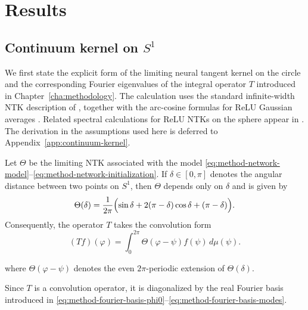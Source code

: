 \chapter{\label{cha:results}Results}

\section{Continuum kernel on \(S^1\)}

We first state the explicit form of the limiting neural tangent kernel on the circle and the
corresponding Fourier eigenvalues of the integral operator \(T\) introduced in
Chapter~\ref{cha:methodology}. The calculation uses the standard infinite-width NTK
description of \citet{jacot2018ntk}, together with the
arc-cosine formulas for ReLU Gaussian averages \citep{cho2009kernel}. Related spectral
calculations for ReLU NTKs on the sphere appear in
\citet{basri2019convergence,bietti2019inductivebiasneuraltangent,cao2020understandingspectralbiasdeep}. The derivation in the
assumptions used here is deferred to Appendix~\ref{app:continuum-kernel}.

\begin{proposition}
	\label{prop:results-continuum-ntk}
	Let \(\Theta\) be the limiting NTK associated with the model
	\eqref{eq:method-network-model}--\eqref{eq:method-network-initialization}. If
	\(\delta\in[0,\pi]\) denotes the angular distance between two points on \(S^1\), then
	\(\Theta\) depends only on \(\delta\) and is given by
	\begin{equation}
		\Theta(\delta)
		=
		\frac{1}{2\pi}
		\Bigl(
		\sin\delta + 2(\pi-\delta)\cos\delta + (\pi-\delta)
		\Bigr).
		\label{eq:results-continuum-ntk}
	\end{equation}
	Consequently, the operator \(T\) takes the convolution form
	\begin{equation}
		(Tf)(\varphi)
		=
		\int_0^{2\pi}\Theta(\varphi-\psi)f(\psi)\,d\mu(\psi).
		\label{eq:results-continuum-operator}
	\end{equation}
\end{proposition}

where \(\Theta(\varphi-\psi)\) denotes the even \(2\pi\)-periodic extension of
\(\Theta(\delta)\).

Since \(T\) is a convolution operator, it is diagonalized by the real Fourier basis
introduced in \eqref{eq:method-fourier-basis-phi0}--\eqref{eq:method-fourier-basis-modes}.

